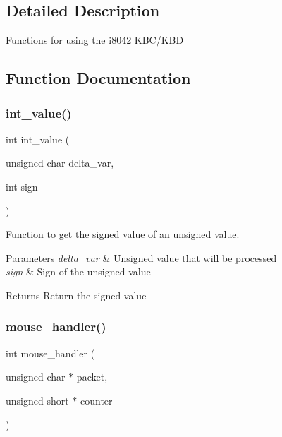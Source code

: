 \subsection{Detailed Description}
Functions for using the i8042 K\+B\+C/\+K\+BD 

\subsection{Function Documentation}
\hypertarget{group__mouse_gaf67a039319066d9e7dcdcc90e3a48840}{}\label{group__mouse_gaf67a039319066d9e7dcdcc90e3a48840} 
\subsubsection{\texorpdfstring{int\+\_\+value()}{int\_value()}}
{\footnotesize\ttfamily int int\+\_\+value (\begin{DoxyParamCaption}\item[{unsigned char}]{delta\+\_\+var,  }\item[{int}]{sign }\end{DoxyParamCaption})}



Function to get the signed value of an unsigned value. 


\begin{DoxyParams}{Parameters}
{\em delta\+\_\+var} & Unsigned value that will be processed \\
\hline
{\em sign} & Sign of the unsigned value\\
\hline
\end{DoxyParams}
\begin{DoxyReturn}{Returns}
Return the signed value 
\end{DoxyReturn}
\hypertarget{group__mouse_gab5168a5f260c8e28f0f75db8a35cdb98}{}\label{group__mouse_gab5168a5f260c8e28f0f75db8a35cdb98} 
\subsubsection{\texorpdfstring{mouse\+\_\+handler()}{mouse\_handler()}}
{\footnotesize\ttfamily int mouse\+\_\+handler (\begin{DoxyParamCaption}\item[{unsigned char $\ast$}]{packet,  }\item[{unsigned short $\ast$}]{counter }\end{DoxyParamCaption})}



